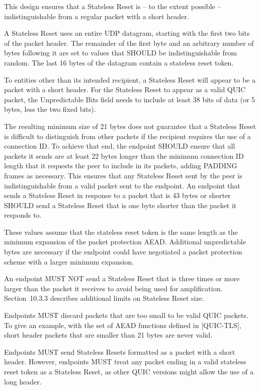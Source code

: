 \documentclass{article}
\begin{document}
This design ensures that a Stateless Reset is -- to the extent possible -- indistinguishable from a regular packet with a short header.

A Stateless Reset uses an entire UDP datagram, starting with the first two bits of the packet header.  The remainder of the first byte and an arbitrary number of bytes following it are set to values that SHOULD be indistinguishable from random.  The last 16 bytes of the datagram contain a stateless reset token.

To entities other than its intended recipient, a Stateless Reset will appear to be a packet with a short header.  For the Stateless Reset to appear as a valid QUIC packet, the Unpredictable Bits field needs to include at least 38 bits of data (or 5 bytes, less the two fixed bits).

The resulting minimum size of 21 bytes does not guarantee that a Stateless Reset is difficult to distinguish from other packets if the recipient requires the use of a connection ID.  To achieve that end, the endpoint SHOULD ensure that all packets it sends are at least 22 bytes longer than the minimum connection ID length that it requests the peer to include in its packets, adding PADDING frames as necessary.  This ensures that any Stateless Reset sent by the peer is indistinguishable from a valid packet sent to the endpoint.  An endpoint that sends a Stateless Reset in response to a packet that is 43 bytes or shorter SHOULD send a Stateless Reset that is one byte shorter than the packet it responds to.

These values assume that the stateless reset token is the same length as the minimum expansion of the packet protection AEAD.  Additional unpredictable bytes are necessary if the endpoint could have negotiated a packet protection scheme with a larger minimum expansion.

An endpoint MUST NOT send a Stateless Reset that is three times or more larger than the packet it receives to avoid being used for amplification.  Section~10.3.3 describes additional limits on Stateless Reset size.

Endpoints MUST discard packets that are too small to be valid QUIC packets.  To give an example, with the set of AEAD functions defined in [QUIC-TLS], short header packets that are smaller than 21 bytes are never valid.

Endpoints MUST send Stateless Resets formatted as a packet with a short header.  However, endpoints MUST treat any packet ending in a valid stateless reset token as a Stateless Reset, as other QUIC versions might allow the use of a long header.
\end{document}
